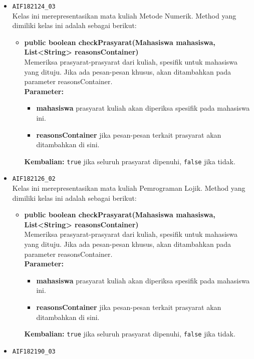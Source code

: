 \begin{enumerate}
\begin{itemize}
\begin{itemize}
		\end{itemize}
		\item \texttt{AIF182124\_03} \\
		Kelas ini merepresentasikan mata kuliah Metode Numerik. Method yang dimiliki kelas ini adalah sebagai berikut: 
		\begin{itemize}
			\item \textbf{public boolean checkPrasyarat(Mahasiswa mahasiswa, List<String> reasonsContainer)}\\
			Memeriksa prasyarat-prasyarat dari kuliah, spesifik untuk mahasiswa yang dituju. Jika ada pesan-pesan khusus, akan ditambahkan pada parameter reasonsContainer.\\
			\textbf{Parameter:}
			\begin{itemize}
				\item \textbf{mahasiswa} prasyarat kuliah akan diperiksa spesifik pada mahasiswa ini.
				\item \textbf{reasonsContainer} jika pesan-pesan terkait prasyarat akan ditambahkan di sini.
			\end{itemize}
			\textbf{Kembalian:} \texttt{true} jika seluruh prasyarat dipenuhi, \texttt{false} jika tidak.
		\end{itemize}
		\item \texttt{AIF182126\_02} \\
		Kelas ini merepresentasikan mata kuliah Pemrograman Lojik. Method yang dimiliki kelas ini adalah sebagai berikut: 
		\begin{itemize}
			\item \textbf{public boolean checkPrasyarat(Mahasiswa mahasiswa, List<String> reasonsContainer)}\\
			Memeriksa prasyarat-prasyarat dari kuliah, spesifik untuk mahasiswa yang dituju. Jika ada pesan-pesan khusus, akan ditambahkan pada parameter reasonsContainer.\\
			\textbf{Parameter:}
			\begin{itemize}
				\item \textbf{mahasiswa} prasyarat kuliah akan diperiksa spesifik pada mahasiswa ini.
				\item \textbf{reasonsContainer} jika pesan-pesan terkait prasyarat akan ditambahkan di sini.
			\end{itemize}
			\textbf{Kembalian:} \texttt{true} jika seluruh prasyarat dipenuhi, \texttt{false} jika tidak.
		\end{itemize}
		\item \texttt{AIF182190\_03} \\

\end{itemize}
\end{enumerate}
